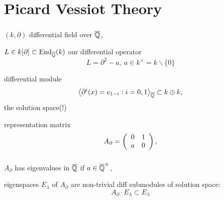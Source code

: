 \section{Picard Vessiot Theory}


\begin{frame}
\frametitle{}
\bi
\item $(k, \partial)$ differential field over $\qzcl$,
\item $L  \in k[\partial] \subset \mathrm{End}_{\qzcl}(k)$ our differential operator
$$L = \partial^2 - a,\ a \in k^\times = k\backslash \{0\}$$
\item differential module
$$\left<\partial^i(x) = e_{1-i} : i = 0, 1\right>_{\qzcl} \subset k \oplus k,$$
the solution space(!)
\item representation matrix
$$A_\partial = \left(\bao{cc}0&1\\a&0\\\ea\right),$$
\ei
\end{frame}

\begin{frame}
\frametitle{}
\bi
\item $A_\partial$ has eigenvalues in $\qzcl$ if $a \in \qzcl^\times$,
\item eigenspaces $E_{\lambda}$ of $A_\partial$ are non-trivial diff submodules of solution space:
$$A_\partial \cdot E_{\lambda} \subset E_\lambda$$
\item 
\ei
\end{frame}

